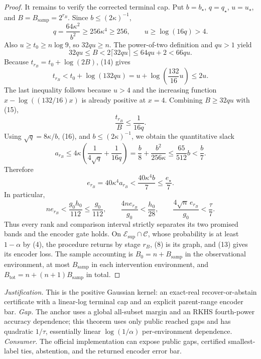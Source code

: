 \documentclass{article}
\begin{document}
\begin{proof}
It remains to verify the corrected terminal cap.  Put \(b=b_{\star}\), \(q=q_{\star}\), \(u=u_{\star}\), and \(B=B_{\mathrm{samp}}=2^{r_B}\).  Since \(b\le(2\kappa)^{-1}\),
\[
 q=\frac{64\kappa^2}{b^2}\ge256\kappa^4\ge256,
 \qquad u\ge\log(16q)>4.
\]
Also \(u\ge t_0\ge n\log9\), so \(32qu\ge n\).  The power-of-two definition and \(qu>1\) yield
\[
 32qu\le B<2\lceil32qu\rceil\le64qu+2<66qu.
 \tag{14}
\]
Because \(t_{r_B}=t_0+\log(2B)\), (14) gives
\[
 t_{r_B}<t_0+\log(132qu)
 =u+\log\!\left(\frac{132}{16}u\right)\le2u.
 \tag{15}
\]
The last inequality follows because \(u>4\) and the increasing function \(x-\log((132/16)x)\) is already positive at \(x=4\).  Combining \(B\ge32qu\) with (15),
\[
 \frac{t_{r_B}}{B}\le\frac1{16q}.
 \tag{16}
\]
Using \(\sqrt q=8\kappa/b\), (16), and \(b\le(2\kappa)^{-1}\), we obtain the quantitative slack
\[
 a_{r_B}
 \le4\kappa\left(\frac1{4\sqrt q}+\frac1{16q}\right)
 =\frac b8+\frac{b^2}{256\kappa}
 \le\frac{65}{512}b<\frac b7.
 \tag{17}
\]
Therefore
\[
 e_{r_B}=40\kappa^4a_{r_B}<\frac{40\kappa^4b}{7}
 \le\frac{e_{\star}}7.
 \tag{18}
\]
In particular,
\[
 ne_{r_B}<\frac{g_0h_0}{112}\le\frac{g_0}{112},
 \qquad
 \frac{4ne_{r_B}}{g_0}<\frac{h_0}{28},
 \qquad
 \frac{4\sqrt n\,e_{r_B}}{g_0}<\frac{\tau}{7}.
 \tag{19}
\]
Thus every rank and comparison interval strictly separates its two promised bands and the encoder gate holds.  On \(\mathcal E_{\mathrm{sup}}\cap\mathcal C\), whose probability is at least \(1-\alpha\) by (4), the procedure returns by stage \(r_B\), (8) is its graph, and (13) gives its encoder loss.  The sample accounting is \(B_0=n+B_{\mathrm{samp}}\) in the observational environment, at most \(B_{\mathrm{samp}}\) in each intervention environment, and \(B_{\mathrm{tot}}=n+(n+1)B_{\mathrm{samp}}\) in total.
\end{proof}
\par\smallskip\noindent \textit{Justification.} This is the positive Gaussian kernel: an exact-real recover-or-abstain certificate with a linear-log terminal cap and an explicit parent-range encoder bar. \textit{Gap.} The anchor uses a global all-subset margin and an RKHS fourth-power accuracy dependence; this theorem uses only public reached gaps and has quadratic \(1/\tau\), essentially linear \(\log(1/\alpha)\) per-environment dependence. \textit{Consumer.} The official implementation can expose public gaps, certified smallest-label ties, abstention, and the returned encoder error bar.
\end{document}
